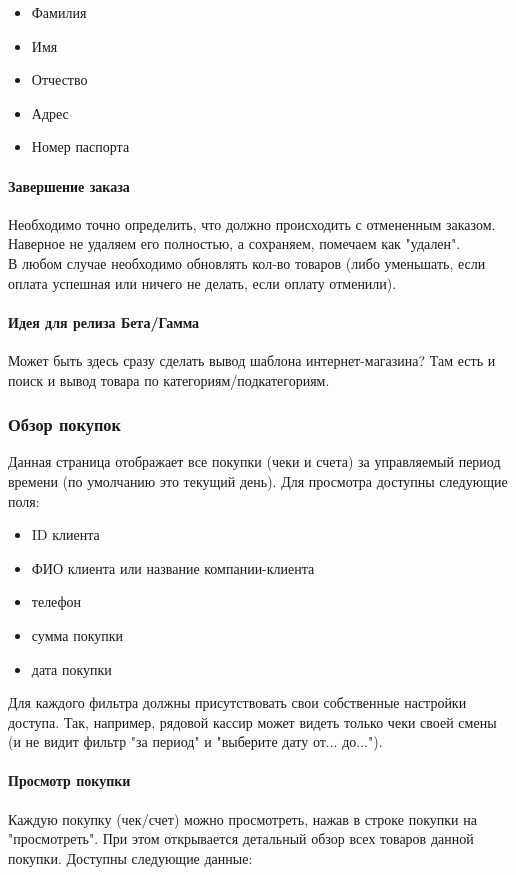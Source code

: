 \documentclass[DIV=calc, paper=a4, fontsize=11pt]{scrartcl} %
\begin{document}
\begin{itemize}
	\item Фамилия
	\item Имя
	\item Отчество
	\item Адрес
	\item Номер паспорта
\end{itemize}


\paragraph{Завершение заказа}
Необходимо точно определить, что должно происходить с отмененным заказом. Наверное не удаляем его полностью, а сохраняем, помечаем как "удален".
\\[0.5cm]
В любом случае необходимо обновлять кол-во товаров (либо уменьшать, если оплата успешная или ничего не делать, если оплату отменили).



\paragraph{Идея для релиза Бета/Гамма}
Может быть здесь сразу сделать вывод шаблона интернет-магазина? Там есть и поиск и вывод товара по категориям/подкатегориям.

\subsubsection{Обзор покупок}
Данная страница отображает все покупки (чеки и счета) за управляемый период времени (по умолчанию это текущий день). Для просмотра доступны следующие поля:

\begin{itemize}
	\item ID клиента
	\item ФИО клиента или название компании-клиента
	\item телефон
	\item сумма покупки 
	\item дата покупки
\end{itemize}

Для каждого фильтра должны присутствовать свои собственные настройки доступа. Так, например, рядовой кассир может видеть только чеки своей смены (и не видит фильтр "за период" и "выберите дату от... до...").

\paragraph{Просмотр покупки}
Каждую покупку (чек/счет) можно просмотреть, нажав в строке покупки на "просмотреть". При этом открывается детальный обзор всех товаров данной покупки. Доступны следующие данные:
\end{document}
